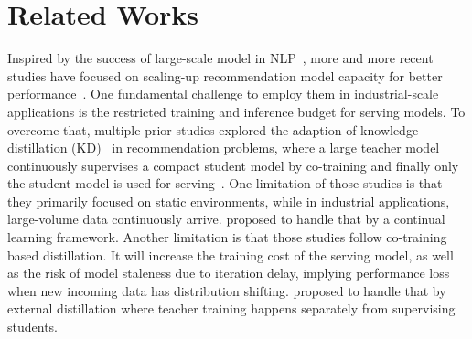 \section{Related Works}
Inspired by the success of large-scale model in NLP~\cite{achiam2023gpt,touvron2023llama}, more and more recent studies have focused on scaling-up recommendation model capacity for better performance~\cite{zhang2024scaling,zhang2024wukong,fang2024scaling,pan2024ads,shin2023scaling,anil2022factory}. 
One fundamental challenge to employ them in industrial-scale applications is the restricted training and inference budget for serving models. 
To overcome that, multiple prior studies explored the adaption of knowledge distillation (KD)~\cite{hinton2015distilling} in recommendation problems, where a large teacher model continuously supervises a compact student model by co-training and finally only the student model is used for serving~\cite{kang2024unbiased,kang2023distillation,chen2023unbiased,liu2022position,kang2021item,kweon2021bidirectional,zhu2020ensembled,tang2018ranking}. 
One limitation of those studies is that they primarily focused on static environments, while in industrial applications, large-volume data continuously arrive. \cite{lee2024continual} proposed to handle that by a continual learning framework. 
Another limitation is that those studies follow co-training based distillation. 
It will increase the training cost of the serving model, as well as the risk of model staleness due to iteration delay, implying performance loss when new incoming data has distribution shifting. \cite{khani2024bridging} proposed to handle that by external distillation where teacher training happens separately from supervising students.

